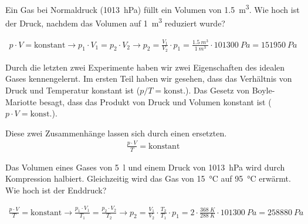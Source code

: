 \documentclass[12pt,a4paper,twoside]{article}
\begin{document}
\begin{aufgabe}
	Ein Gas bei Normaldruck (\SI{1013}{hPa}) füllt ein Volumen von \SI{1.5}{m^3}. Wie hoch ist der Druck,
	nachdem das Volumen auf \SI{1}{m^3} reduziert wurde?
	\begin{loesung}
		\begin{eqnarray*}
			p\cdot V = \text{konstant} \to p_1\cdot V_1 = p_2\cdot V_2 \to p_2 =\frac{V_1}{V_2}\cdot p_1=\frac{\SI{1.5}{m^3}}{\SI{1}{m^3}}\cdot \SI{101300}{Pa}=\SI{151950}{Pa}
		\end{eqnarray*}
	\end{loesung}
\end{aufgabe}

Durch die letzten zwei Experimente haben wir zwei Eigenschaften des idealen Gases kennengelernt.
Im ersten Teil haben wir gesehen, dass das Verhältnis von Druck und Temperatur konstant ist ($p/T =\text{konst.}$).
Das Gesetz von Boyle-Mariotte besagt, dass das Produkt von Druck und Volumen konstant ist ($p\cdot V =\text{konst.}$).

Diese zwei Zusammenhänge lassen sich durch einen ersetzten.
\begin{eqnarray*}
	\frac{p\cdot V}{T} = \text{konstant}
\end{eqnarray*}

\begin{aufgabe}
	Das Volumen eines Gases von \SI{5}{l} und einem Druck von \SI{1013}{hPa} wird durch Kompression halbiert. 
	Gleichzeitig wird das Gas von \SI{15}{\celsius} auf \SI{95}{\celsius} erwärmt. 
	Wie hoch ist der Enddruck?
	\begin{loesung}
		\begin{eqnarray*}
			\frac{p\cdot V}{T}=\text{konstant}\to \frac{p_1\cdot V_1}{T_1}=\frac{p_2\cdot V_2}{T_2}\to p_2 =\frac{V_1}{V_2}\cdot\frac{T_2}{T_1}\cdot p_1=\num{2}\cdot\frac{\SI{368}{K}}{\SI{288}{K}}\cdot\SI{101300}{Pa}=\SI{258880}{Pa}
		\end{eqnarray*}
	\end{loesung}
\end{aufgabe}
\end{document}
